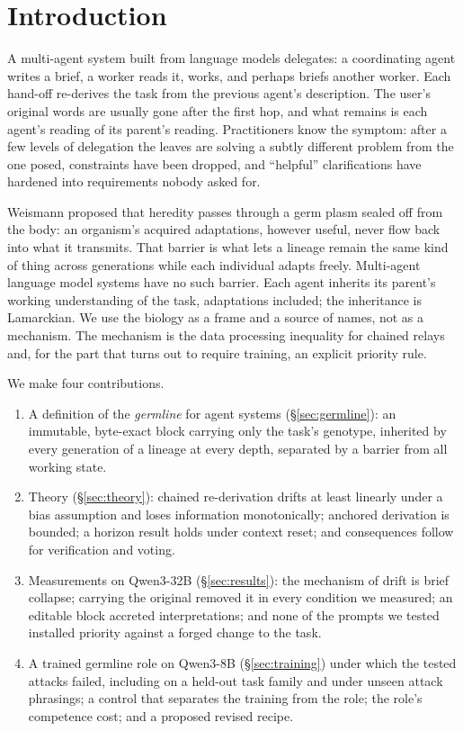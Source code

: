 \documentclass[11pt]{article}
\newcommand{\germ}{\textsf{germline}}
\begin{document}
\section{Introduction}

A multi-agent system built from language models delegates: a coordinating agent writes a brief, a worker reads it, works, and perhaps briefs another worker. Each hand-off re-derives the task from the previous agent's description. The user's original words are usually gone after the first hop, and what remains is each agent's reading of its parent's reading. Practitioners know the symptom: after a few levels of delegation the leaves are solving a subtly different problem from the one posed, constraints have been dropped, and ``helpful'' clarifications have hardened into requirements nobody asked for.

Weismann \citep{weismann1892} proposed that heredity passes through a germ plasm sealed off from the body: an organism's acquired adaptations, however useful, never flow back into what it transmits. That barrier is what lets a lineage remain the same kind of thing across generations while each individual adapts freely. Multi-agent language model systems have no such barrier. Each agent inherits its parent's working understanding of the task, adaptations included; the inheritance is Lamarckian. We use the biology as a frame and a source of names, not as a mechanism. The mechanism is the data processing inequality for chained relays and, for the part that turns out to require training, an explicit priority rule.

We make four contributions.
\begin{enumerate}
\item A definition of the \emph{germline} for agent systems (\S\ref{sec:germline}): an immutable, byte-exact block carrying only the task's genotype, inherited by every generation of a lineage at every depth, separated by a barrier from all working state.
\item Theory (\S\ref{sec:theory}): chained re-derivation drifts at least linearly under a bias assumption and loses information monotonically; anchored derivation is bounded; a horizon result holds under context reset; and consequences follow for verification and voting.
\item Measurements on Qwen3-32B (\S\ref{sec:results}): the mechanism of drift is brief collapse; carrying the original removed it in every condition we measured; an editable block accreted interpretations; and none of the prompts we tested installed priority against a forged change to the task.
\item A trained \germ{} role on Qwen3-8B (\S\ref{sec:training}) under which the tested attacks failed, including on a held-out task family and under unseen attack phrasings; a control that separates the training from the role; the role's competence cost; and a proposed revised recipe.
\end{enumerate}
\end{document}
